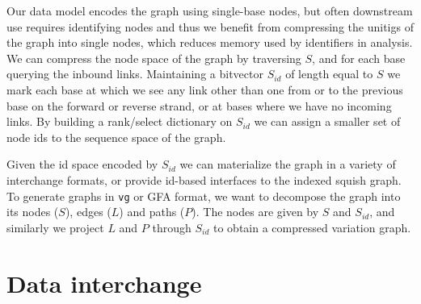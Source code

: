 Our data model encodes the graph using single-base nodes, but often downstream use requires identifying nodes and thus we benefit from compressing the unitigs of the graph into single nodes, which reduces memory used by identifiers in analysis.
We can compress the node space of the graph by traversing $S$, and for each base querying the inbound links.
Maintaining a bitvector $S_{id}$ of length equal to $S$ we mark each base at which we see any link other than one from or to the previous base on the forward or reverse strand, or at bases where we have no incoming links.
By building a rank/select dictionary on $S_{id}$ we can assign a smaller set of node ids to the sequence space of the graph.

Given the id space encoded by $S_{id}$ we can materialize the graph in a variety of interchange formats, or provide id-based interfaces to the indexed squish graph.
To generate graphs in {\tt vg}  or GFA format, we want to decompose the graph into its nodes ($S$), edges ($L$) and paths ($P$).
The nodes are given by $S$ and $S_{id}$, and similarly we project $L$ and $P$ through $S_{id}$ to obtain a compressed variation graph.


\section{Data interchange}

